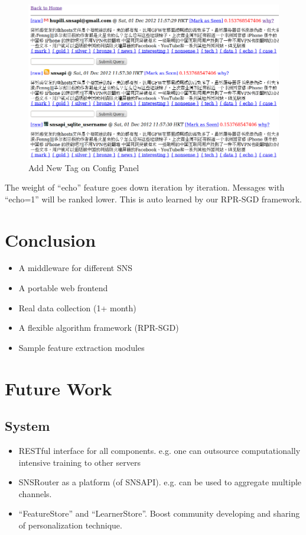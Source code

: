 \documentclass{sig-alternate}
\begin{document}
\begin{figure}[h!]
	\centering
	\includegraphics[width=0.7\linewidth]{../pic/echo_ranked_timeline_before.png}
	\caption{Add New Tag on Config Panel}
\end{figure}


The weight of ``echo'' feature goes down iteration by iteration. Messages with ``echo=1''
will be ranked lower. This is auto learned by our RPR-SGD framework.

\section{Conclusion}
\label{sec:Conclusion}

\begin{itemize}
	\item A middleware for different SNS
	\item A portable web frontend
	\item Real data collection (1+ month)
	\item A flexible algorithm framework (RPR-SGD)
	\item Sample feature extraction modules
\end{itemize}



\section{Future Work}
\label{sec:Future Work}

\subsection{System}
\label{sec:fu_System}

\begin{itemize}
	\item RESTful interface for all components.
		e.g. one can outsource computationally
		intensive training to other servers
	\item SNSRouter as a platform (of SNSAPI).
		e.g. can be used to aggregate multiple
		channels. 
	\item ``FeatureStore'' and ``LearnerStore''. 
		Boost community developing and sharing of 
		personalization technique. 
\end{itemize}
\end{document}
